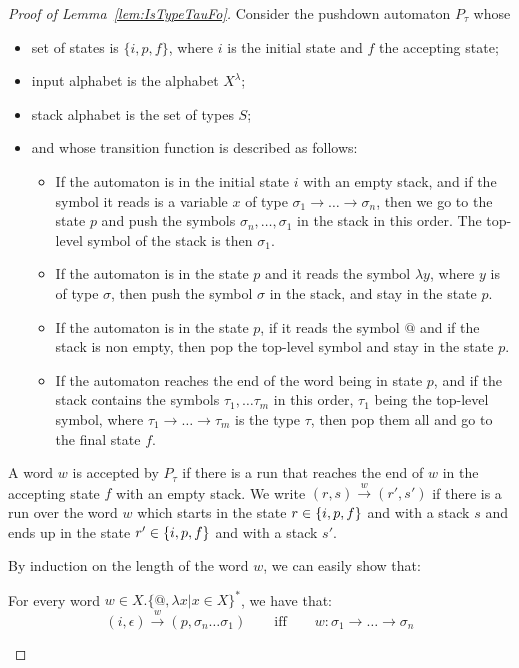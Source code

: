 \begin{proof}[Proof of Lemma~\ref{lem:IsTypeTauFo}]

Consider the pushdown automaton $P_\tau$ whose
\begin{itemize}
\item  set of states is $\{i, p, f\}$, where $i$ is the initial state and $f$ the accepting state;
\item input alphabet is the alphabet $X^\lambda$;
\item stack alphabet is the set of types $S$;
\item and whose transition function is described as follows:
\begin{itemize}
\item If the automaton is in the initial state $i$ with an empty stack, and if the symbol it reads is a variable $x$ of type $\sigma_1\rightarrow\dots\rightarrow\sigma_n$, then we go to the state $p$ and push the symbols $\sigma_n,\dots,\sigma_1$  in the stack in this order. The top-level symbol of the stack is then $\sigma_1$.
\item If the automaton is in the state $p$ and it reads the symbol $\lambda y$, where $y$ is of type $\sigma$, then push the symbol $\sigma$ in the stack, and stay in the state $p$.
\item  If the automaton is in the state $p$,  if it reads the symbol $@$ and if the stack is non empty, then pop the top-level symbol and stay in the state $p$.
\item If the automaton reaches the end of the word being in state $p$, and if the stack contains the symbols $\tau_1,\dots\tau_m$ in this order, $\tau_1$ being the top-level symbol, where $\tau_1\rightarrow\dots\rightarrow\tau_m$ is the type $\tau$, then pop them all and go to the final state $f$.  
\end{itemize}
\end{itemize}
A word $w$ is accepted by $P_\tau$ if there is a run that reaches the end of $w$ in the accepting state $f$ with an empty stack. We write $(r, s)\xrightarrow{w} (r', s')$ if there is a run over the word $w$ which starts in the state $r\in\{i, p,f\}$ and with a stack $s$ and ends up in the state $r'\in\{i, p,f\}$ and with a stack $s'$.


By induction on the length of the word $w$, we can easily show that:
\begin{lemma}
For every word $w\in X.\{@,\lambda x | x\in X \}^*$, we have that:
 $$(i, \epsilon)\xrightarrow{w} (p, \sigma_n\dots\sigma_1) \qquad\text{iff} \qquad 
w:\sigma_1\rightarrow\dots\rightarrow\sigma_n$$ 
\end{lemma}


\end{proof}
